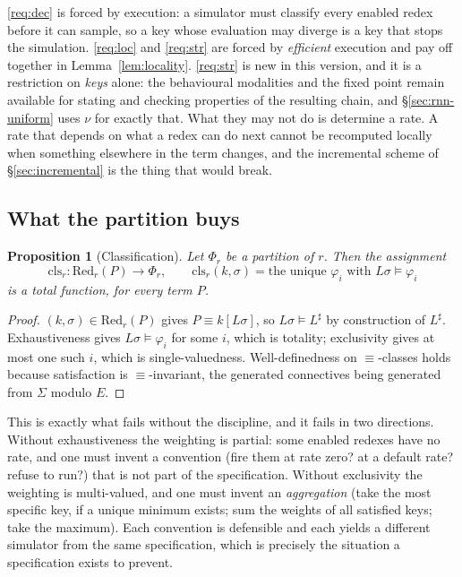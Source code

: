 \documentclass[11pt,a4paper]{article}
\theoremstyle{plain}
\newtheorem{proposition}[theorem]{Proposition}
\theoremstyle{definition}
\theoremstyle{remark}
\newcommand{\Red}{\mathrm{Red}}
\newcommand{\class}{\mathrm{cls}}
\begin{document}
\ref{req:dec} is forced by execution: a simulator must classify every enabled redex before it can
sample, so a key whose evaluation may diverge is a key that stops the simulation. \ref{req:loc} and
\ref{req:str} are forced by \emph{efficient} execution and pay off together in
Lemma~\ref{lem:locality}. \ref{req:str} is new in this version, and it is a restriction on
\emph{keys} alone: the behavioural modalities and the fixed point remain available for stating and
checking properties of the resulting chain, and \S\ref{sec:rnn-uniform} uses $\nu$ for exactly that.
What they may not do is determine a rate. A rate that depends on what a redex can do next cannot be
recomputed locally when something elsewhere in the term changes, and the incremental scheme of
\S\ref{sec:incremental} is the thing that would break.

\subsection{What the partition buys}
\label{sec:what-partition-buys}

\begin{proposition}[Classification]
\label{prop:classify}
Let $\Phi_r$ be a partition of $r$. Then the assignment
\[
\class_r : \Red_r(P) \longrightarrow \Phi_r,
\qquad
\class_r(k, \sigma) = \text{the unique } \varphi_i \text{ with } L\sigma \models \varphi_i
\]
is a total function, for every term $P$.
\end{proposition}

\begin{proof}
$(k,\sigma) \in \Red_r(P)$ gives $P \equiv k[L\sigma]$, so $L\sigma \models L^\sharp$ by
construction of $L^\sharp$. Exhaustiveness gives $L\sigma \models \varphi_i$ for some $i$, which is
totality; exclusivity gives at most one such $i$, which is single-valuedness. Well-definedness on
$\equiv$-classes holds because satisfaction is $\equiv$-invariant, the generated connectives being
generated from $\Sigma$ modulo $E$.
\end{proof}

This is exactly what fails without the discipline, and it fails in two directions. Without
exhaustiveness the weighting is partial: some enabled redexes have no rate, and one must invent a
convention (fire them at rate zero? at a default rate? refuse to run?) that is not part of the
specification. Without exclusivity the weighting is multi-valued, and one must invent an
\emph{aggregation} (take the most specific key, if a unique minimum exists; sum the weights of all
satisfied keys; take the maximum). Each convention is defensible and each yields a different
simulator from the same specification, which is precisely the situation a specification exists to
prevent.
\end{document}
